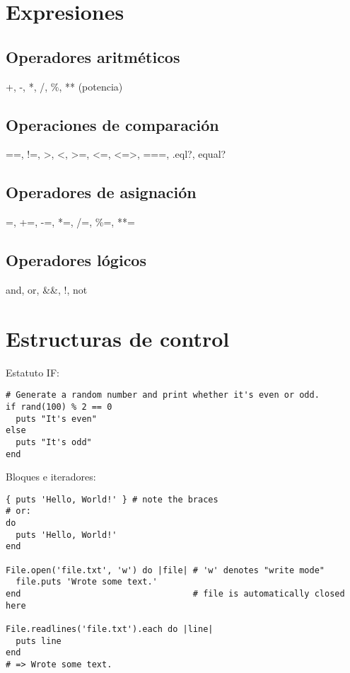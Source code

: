 \documentclass{IEEEtran}
\begin{document}
\section{Expresiones}
\subsection{Operadores aritm\'eticos}
+, -, *, /, \%, ** (potencia)

\subsection{Operaciones de comparaci\'on}
==, !=, >, <, >=, <=, <=>, ===, .eql?, equal?

\subsection{Operadores de asignaci\'on}
=, +=, -=, *=, /=, \%=, **=

\subsection{Operadores l\'ogicos}
and, or, \&\&, !, not

\section{Estructuras de control}
Estatuto IF:
\begin{lstlisting}
# Generate a random number and print whether it's even or odd.
if rand(100) % 2 == 0
  puts "It's even"
else
  puts "It's odd"
end
\end{lstlisting}

Bloques e iteradores:
\begin{lstlisting}
{ puts 'Hello, World!' } # note the braces
# or:
do
  puts 'Hello, World!'
end

File.open('file.txt', 'w') do |file| # 'w' denotes "write mode"
  file.puts 'Wrote some text.'
end                                  # file is automatically closed here

File.readlines('file.txt').each do |line|
  puts line
end
# => Wrote some text.
\end{lstlisting}
\end{document}
